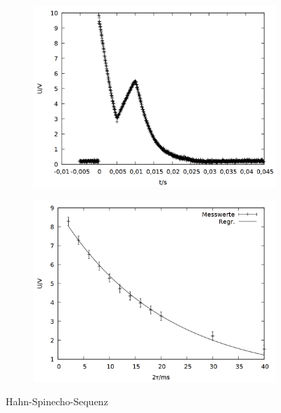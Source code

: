 \begin{figure}[h]
  \begin{subfigure}[h]{0.5\textwidth}
    \centering
    \includegraphics[width=\linewidth]{data/p402_443_data/hahn_sequenz/plot_146.png}
    \label{fig:hahn_bsp}
  \end{subfigure}%
  \begin{subfigure}[h]{0.5\textwidth}
    \centering
    \includegraphics[width=\linewidth]{data/p402_443_data/hahn_sequenz/out_hahn.png}
    \label{fig:hahn_data}
  \end{subfigure}
  \caption{Hahn-Spinecho-Sequenz}
\end{figure}

